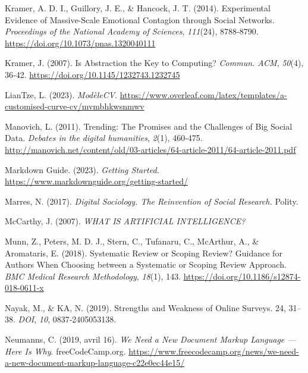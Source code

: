 \documentclass[
  letterpaper,
  DIV=11,
  numbers=noendperiod,
  oneside]{scrreprt}
\newlength{\cslhangindent}
\newlength{\cslentryspacingunit} %
\newenvironment{CSLReferences}[2] %
 {%
  \setlength{\parindent}{0pt}
  \ifodd #1
  \let\oldpar\par
  \def\par{\hangindent=\cslhangindent\oldpar}
  \fi
  \setlength{\parskip}{#2\cslentryspacingunit}
 }%
 {}
\begin{document}
\begin{CSLReferences}{1}{0}
\leavevmode{}%
Kramer, A. D. I., Guillory, J. E., \& Hancock, J. T. (2014).
Experimental Evidence of Massive-Scale Emotional Contagion through
Social Networks. \emph{Proceedings of the National Academy of Sciences},
\emph{111}(24), 8788‑8790. \url{https://doi.org/10.1073/pnas.1320040111}

\leavevmode{}%
Kramer, J. (2007). Is Abstraction the Key to Computing? \emph{Commun.
ACM}, \emph{50}(4), 36‑42. \url{https://doi.org/10.1145/1232743.1232745}

\leavevmode{}%
LianTze, L. (2023). \emph{{ModèleCV}}.
\url{https://www.overleaf.com/latex/templates/a-customised-curve-cv/mvmbhkwsnmwv}

\leavevmode{}%
Manovich, L. (2011). Trending: {The} Promises and the Challenges of Big
Social Data. \emph{Debates in the digital humanities}, \emph{2}(1),
460‑475.
\url{http://manovich.net/content/old/03-articles/64-article-2011/64-article-2011.pdf}

\leavevmode{}%
Markdown Guide. (2023). \emph{Getting {Started}}.
\url{https://www.markdownguide.org/getting-started/}

\leavevmode{}%
Marres, N. (2017). \emph{Digital {Sociology}. {The Reinvention} of
{Social Research}.} Polity.

\leavevmode{}%
McCarthy, J. (2007). \emph{{WHAT IS ARTIFICIAL INTELLIGENCE}?}

\leavevmode{}%
Munn, Z., Peters, M. D. J., Stern, C., Tufanaru, C., McArthur, A., \&
Aromataris, E. (2018). Systematic Review or Scoping Review? {Guidance}
for Authors When Choosing between a Systematic or Scoping Review
Approach. \emph{BMC Medical Research Methodology}, \emph{18}(1), 143.
\url{https://doi.org/10.1186/s12874-018-0611-x}

\leavevmode{}%
Nayak, M., \& KA, N. (2019). Strengths and Weakness of Online Surveys.
24, 31--38. \emph{DOI}, \emph{10}, 0837‑2405053138.

\leavevmode{}%
Neumanns, C. (2019, avril 16). \emph{We Need a New Document Markup
Language --- Here Is Why}. freeCodeCamp.org.
\url{https://www.freecodecamp.org/news/we-need-a-new-document-markup-language-c22e0ec44e15/}


\end{CSLReferences}
\end{document}
